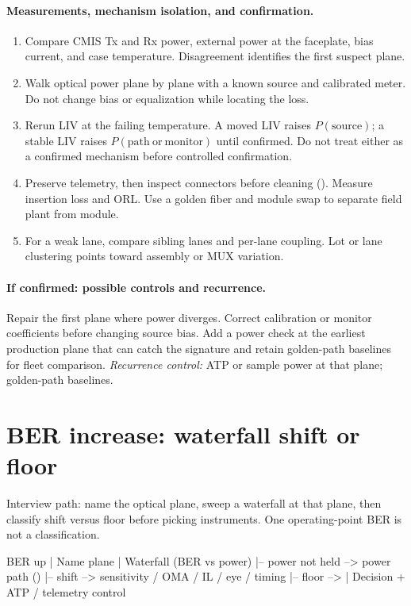 \paragraph{Measurements, mechanism isolation, and confirmation.}
\begin{enumerate}
\item Compare CMIS Tx and Rx power, external power at the faceplate, bias current,
      and case temperature. Disagreement identifies the first suspect plane.
\item Walk optical power plane by plane with a known source and calibrated meter.
      Do not change bias or equalization while locating the loss.
\item Rerun LIV at the failing temperature. A moved LIV raises $P(\mathrm{source})$;
      a stable LIV raises $P(\mathrm{path\ or\ monitor})$ until confirmed. Do not treat
      either as a confirmed mechanism before controlled confirmation.
\item Preserve telemetry, then inspect connectors before cleaning
      (). Measure insertion loss and ORL. Use a golden
      fiber and module swap to separate field plant from module.
\item For a weak lane, compare sibling lanes and per-lane coupling. Lot or lane
      clustering points toward assembly or MUX variation.
\end{enumerate}

\paragraph{If confirmed: possible controls and recurrence.}
Repair the first plane where power diverges. Correct calibration or monitor
coefficients before changing source bias. Add a power check at the earliest
production plane that can catch the signature and retain golden-path baselines
for fleet comparison.
\emph{Recurrence control:} ATP or sample power at that plane; golden-path baselines.

\section{BER increase: waterfall shift or floor}
\label{sec:fm-ber-increase}

Interview path: name the optical plane, sweep a waterfall at that plane, then
classify shift versus floor before picking instruments. One operating-point BER
is not a classification.

\begin{dectree}
BER up
  |
Name plane
  |
Waterfall (BER vs power)
  |-- power not held --> power path ()
  |-- shift --> sensitivity / OMA / IL / eye / timing
  |-- floor --> 
  |
Decision + ATP / telemetry control
\end{dectree}

